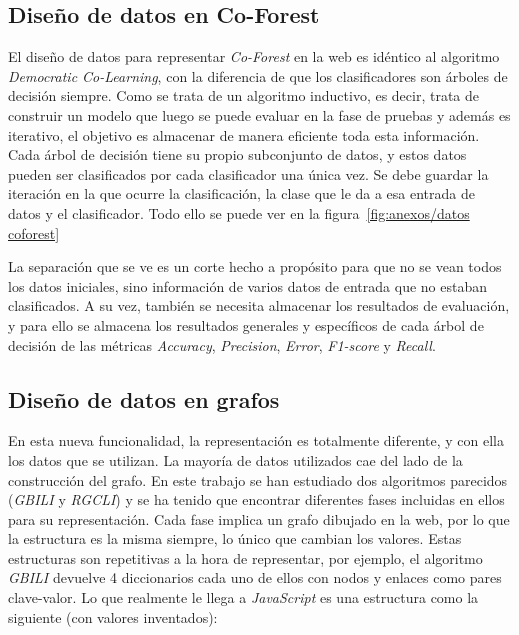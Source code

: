 \subsection{Diseño de datos en Co-Forest}
El diseño de datos para representar \textit{Co-Forest} en la web es idéntico al algoritmo \textit{Democratic Co-Learning}, con la diferencia de que los clasificadores son árboles de decisión siempre. Como se trata de un algoritmo inductivo, es decir, trata de construir un modelo que luego se puede evaluar en la fase de pruebas y además es iterativo, el objetivo es almacenar de manera eficiente toda esta información. Cada árbol de decisión tiene su propio subconjunto de datos, y estos datos pueden ser clasificados por cada clasificador una única vez. Se debe guardar la iteración en la que ocurre la clasificación, la clase que le da a esa entrada de datos y el clasificador. Todo ello se puede ver en la figura~\ref{fig:anexos/datos coforest}


La separación que se ve es un corte hecho a propósito para que no se vean todos los datos iniciales, sino información de varios datos de entrada que no estaban clasificados.
A su vez, también se necesita almacenar los resultados de evaluación, y para ello se almacena los resultados generales y específicos de cada árbol de decisión de las métricas \textit{Accuracy}, \textit{Precision}, \textit{Error}, \textit{F1-score} y \textit{Recall}.
\subsection{Diseño de datos en grafos}
En esta nueva funcionalidad, la representación es totalmente diferente, y con ella los datos que se utilizan. La mayoría de datos utilizados cae del lado de la construcción del grafo. En este trabajo se han estudiado dos algoritmos parecidos (\textit{GBILI} y \textit{RGCLI}) y se ha tenido que encontrar diferentes fases incluidas en ellos para su representación. Cada fase implica un grafo dibujado en la web, por lo que la estructura es la misma siempre, lo único que cambian los valores. Estas estructuras son repetitivas a la hora de representar, por ejemplo, el algoritmo \textit{GBILI} devuelve 4 diccionarios cada uno de ellos con nodos y enlaces como pares clave-valor. Lo que realmente le llega a \textit{JavaScript} es una estructura como la siguiente (con valores inventados): 

